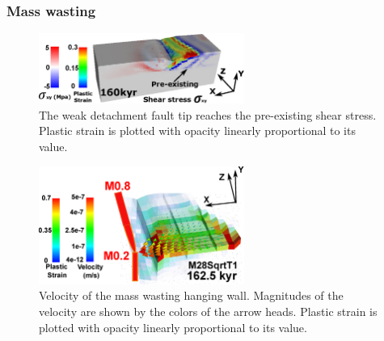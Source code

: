 \subsubsection{Mass wasting}\label{para_CutBack}


\begin{figure}[h]
  \centering
    \includegraphics[width=0.6\textwidth]{./Figures/fig_Results4_5_sqrt_cut_back_pre_accummulated_shear_zone.eps}
  \caption{The weak detachment fault tip reaches the pre-existing shear stress. Plastic strain is plotted with opacity linearly proportional to its value.}
 \label{fig_Results4_5}
\end{figure}   

\begin{figure}[h]
  \centering
    \includegraphics[width=0.6\textwidth]{./Figures/fig_Results_3_2_5_Cut-back_velocity.eps}
  \caption{Velocity of the mass wasting hanging wall. Magnitudes of the velocity are shown by the colors of the arrow heads. Plastic strain is plotted with opacity linearly proportional to its value.}
 \label{fig_Results_3_2_5_Cut-back_velocity}
\end{figure}   

